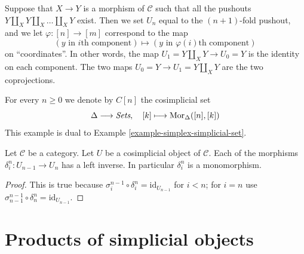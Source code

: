 \begin{example}
\label{example-push-outs-simplicial-object}
Suppose that $X\to Y$ is a morphism of $\mathcal{C}$ such that all
the pushouts $Y\amalg_X Y \amalg_X \ldots \amalg_X Y$ exist.
Then we set $U_n$ equal to the $(n + 1)$-fold pushout,
and we let $\varphi : [n] \to [m]$ correspond to the map
$$
(y \text{ in }i\text{th component})
\mapsto
(y \text{ in }\varphi(i)\text{th component})
$$
on ``coordinates''.
In other words, the map $U_1 = Y \amalg_X Y \to U_0 = Y$ is the
identity on each component.
The two maps $U_0 = Y \to U_1 = Y \amalg_X Y$ are the two coprojections.
\end{example}

\begin{example}
\label{example-simplex-cosimplicial-set}
For every $n \geq 0$ we denote by $C[n]$ the cosimplicial set
$$
\Delta \longrightarrow \textit{Sets},\quad
[k] \longmapsto \mathop{\mathrm{Mor}}\nolimits_{\Delta}([n], [k])
$$
This example is dual to Example \ref{example-simplex-simplicial-set}.
\end{example}

\begin{lemma}
\label{lemma-di-injective}
Let $\mathcal{C}$ be a category.
Let $U$ be a cosimplicial object of $\mathcal{C}$.
Each of the morphisms $\delta^n_i : U_{n - 1} \to U_n$
has a left inverse. In particular $\delta^n_i$ is a monomorphism.
\end{lemma}

\begin{proof}
This is true because
$\sigma_i^{n - 1} \circ \delta^n_i = \text{id}_{U_{n - 1}}$
for $i < n$; for $i = n$ use $\sigma_{n - 1}^{n - 1} \circ \delta^n_n = \text{id}_{U_{n - 1}}$.
\end{proof}


























\section{Products of simplicial objects}
\label{section-products}

